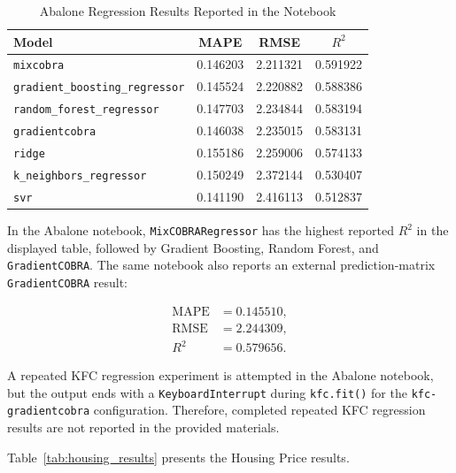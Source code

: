 \begin{table}[H]
    \centering
    \caption{Abalone Regression Results Reported in the Notebook}
    \label{tab:abalone_results}
    \small
    \begin{tabular}{l c c c}
        \hline
        \textbf{Model}                         & \textbf{MAPE} & \textbf{RMSE} & \textbf{$R^2$} \\
        \hline
        \texttt{mixcobra}                      & 0.146203      & 2.211321      & 0.591922 \\
        \texttt{gradient\_boosting\_regressor} & 0.145524      & 2.220882      & 0.588386 \\
        \texttt{random\_forest\_regressor}     & 0.147703      & 2.234844      & 0.583194 \\
        \texttt{gradientcobra}                 & 0.146038      & 2.235015      & 0.583131 \\
        \texttt{ridge}                         & 0.155186      & 2.259006      & 0.574133 \\
        \texttt{k\_neighbors\_regressor}       & 0.150249      & 2.372144      & 0.530407 \\
        \texttt{svr}                           & 0.141190      & 2.416113      & 0.512837 \\
        \hline
    \end{tabular}
\end{table}

In the Abalone notebook, \texttt{MixCOBRARegressor} has the highest reported $R^2$ in the displayed table, followed by Gradient Boosting, Random Forest, and \texttt{GradientCOBRA}. The same notebook also reports an external prediction-matrix \texttt{GradientCOBRA} result:

\[
\begin{aligned}
\text{MAPE} &= 0.145510, \\
\text{RMSE} &= 2.244309, \\
R^2 &= 0.579656.
\end{aligned}
\]

A repeated KFC regression experiment is attempted in the Abalone notebook, but the output ends with a \texttt{KeyboardInterrupt} during \texttt{kfc.fit()} for the \texttt{kfc-gradientcobra} configuration. Therefore, completed repeated KFC regression results are not reported in the provided materials.

Table~\ref{tab:housing_results} presents the Housing Price results.

